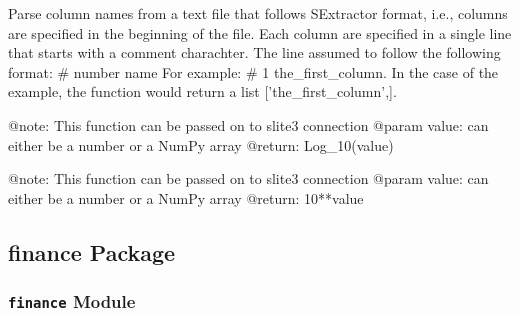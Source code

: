 \documentclass[letterpaper,10pt,english]{sphinxmanual}
\begin{document}

\begin{fulllineitems}
\label{SamPy.db:SamPy.db.sqlite.parseColumnNamesSAMTables}
Parse column names from a text file that follows
SExtractor format, i.e., columns are specified in
the beginning of the file. Each column are specified
in a single line that starts with a comment charachter.
The line assumed to follow the following format:
\# number name
For example:
\# 1 the\_first\_column.
In the case of the example, the function would return
a list {[}'the\_first\_column',{]}.

\end{fulllineitems}



\begin{fulllineitems}
\label{SamPy.db:SamPy.db.sqlite.toLogTen}
@note: This function can be passed on to slite3 connection
@param value: can either be a number or a NumPy array 
@return: Log\_10(value)

\end{fulllineitems}



\begin{fulllineitems}
\label{SamPy.db:SamPy.db.sqlite.toPowerTen}
@note: This function can be passed on to slite3 connection
@param value: can either be a number or a NumPy array
@return: 10**value

\end{fulllineitems}



\subsection{finance Package}
\label{SamPy.finance:finance-package}\label{SamPy.finance::doc}

\subsubsection{\texttt{finance} Module}
\label{SamPy.finance:finance-module}\label{SamPy.finance:module-SamPy.finance.finance}
\end{document}
